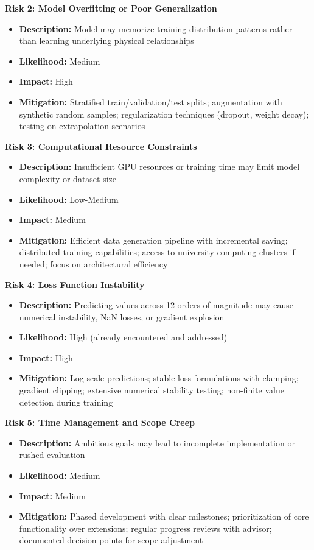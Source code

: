 \documentclass[a4paper,12pt]{report}
\begin{document}
\textbf{Risk 2: Model Overfitting or Poor Generalization}
\begin{itemize}
    \item \textbf{Description:} Model may memorize training distribution patterns rather than learning underlying physical relationships
    \item \textbf{Likelihood:} Medium
    \item \textbf{Impact:} High
    \item \textbf{Mitigation:} Stratified train/validation/test splits; augmentation with synthetic random samples; regularization techniques (dropout, weight decay); testing on extrapolation scenarios
\end{itemize}

\textbf{Risk 3: Computational Resource Constraints}
\begin{itemize}
    \item \textbf{Description:} Insufficient GPU resources or training time may limit model complexity or dataset size
    \item \textbf{Likelihood:} Low-Medium
    \item \textbf{Impact:} Medium
    \item \textbf{Mitigation:} Efficient data generation pipeline with incremental saving; distributed training capabilities; access to university computing clusters if needed; focus on architectural efficiency
\end{itemize}

\textbf{Risk 4: Loss Function Instability}
\begin{itemize}
    \item \textbf{Description:} Predicting values across 12 orders of magnitude may cause numerical instability, NaN losses, or gradient explosion
    \item \textbf{Likelihood:} High (already encountered and addressed)
    \item \textbf{Impact:} High
    \item \textbf{Mitigation:} Log-scale predictions; stable loss formulations with clamping; gradient clipping; extensive numerical stability testing; non-finite value detection during training
\end{itemize}

\textbf{Risk 5: Time Management and Scope Creep}
\begin{itemize}
    \item \textbf{Description:} Ambitious goals may lead to incomplete implementation or rushed evaluation
    \item \textbf{Likelihood:} Medium
    \item \textbf{Impact:} Medium
    \item \textbf{Mitigation:} Phased development with clear milestones; prioritization of core functionality over extensions; regular progress reviews with advisor; documented decision points for scope adjustment
\end{itemize}
\end{document}
